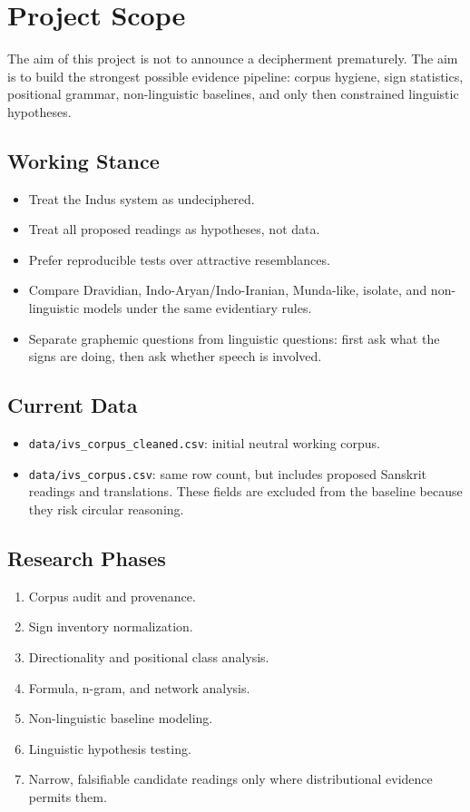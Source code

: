 \section{Project Scope}

The aim of this project is not to announce a decipherment prematurely. The aim is to build the strongest possible evidence pipeline: corpus hygiene, sign statistics, positional grammar, non-linguistic baselines, and only then constrained linguistic hypotheses.

\subsection{Working Stance}

\begin{itemize}
  \item Treat the Indus system as undeciphered.
  \item Treat all proposed readings as hypotheses, not data.
  \item Prefer reproducible tests over attractive resemblances.
  \item Compare Dravidian, Indo-Aryan/Indo-Iranian, Munda-like, isolate, and non-linguistic models under the same evidentiary rules.
  \item Separate graphemic questions from linguistic questions: first ask what the signs are doing, then ask whether speech is involved.
\end{itemize}

\subsection{Current Data}

\begin{itemize}
  \item \texttt{data/ivs\_corpus\_cleaned.csv}: initial neutral working corpus.
  \item \texttt{data/ivs\_corpus.csv}: same row count, but includes proposed Sanskrit readings and translations. These fields are excluded from the baseline because they risk circular reasoning.
\end{itemize}

\subsection{Research Phases}

\begin{enumerate}
  \item Corpus audit and provenance.
  \item Sign inventory normalization.
  \item Directionality and positional class analysis.
  \item Formula, n-gram, and network analysis.
  \item Non-linguistic baseline modeling.
  \item Linguistic hypothesis testing.
  \item Narrow, falsifiable candidate readings only where distributional evidence permits them.
\end{enumerate}

